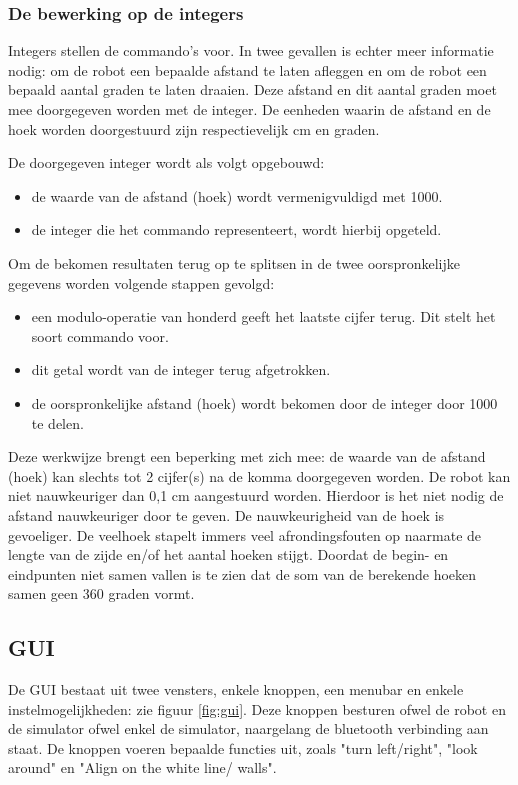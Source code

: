 \documentclass[tt3]{penoverslag}
\begin{document}
\subsubsection{De bewerking op de integers} %
\label{sssec:integer}
Integers stellen de commando's voor. In twee gevallen is echter meer informatie nodig: om de robot een bepaalde afstand te laten afleggen en om de robot een bepaald aantal graden te laten draaien. Deze afstand en dit aantal graden moet mee doorgegeven worden met de integer. De eenheden waarin de afstand en de hoek worden doorgestuurd zijn respectievelijk cm en graden.

De doorgegeven integer wordt als volgt opgebouwd:

\begin{itemize}
\item de waarde van de afstand (hoek) wordt vermenigvuldigd met 1000.
\item de integer die het commando representeert, wordt hierbij opgeteld.
\end{itemize}

Om de bekomen resultaten terug op te splitsen in de twee oorspronkelijke gegevens worden volgende stappen gevolgd:

\begin{itemize}
\item een modulo-operatie van honderd geeft het laatste cijfer terug. Dit stelt het soort commando voor.
\item dit getal wordt van de integer terug afgetrokken.
\item de oorspronkelijke afstand (hoek) wordt bekomen door de integer door 1000 te delen.
\end{itemize}

Deze werkwijze brengt een beperking met zich mee: de waarde van de afstand (hoek) kan slechts tot 2 cijfer(s) na de komma doorgegeven worden. De robot kan niet nauwkeuriger dan 0,1 cm aangestuurd worden. Hierdoor is het niet nodig de afstand nauwkeuriger door te geven. De nauwkeurigheid van de hoek is gevoeliger. De veelhoek stapelt immers veel afrondingsfouten op naarmate de lengte van de zijde en/of het aantal hoeken stijgt. Doordat de begin- en eindpunten niet samen vallen is te zien dat de som van de berekende hoeken samen geen 360 graden vormt. 

\subsection{GUI} %
\label{ssec:GUI}
De GUI bestaat uit twee vensters, enkele knoppen, een menubar en enkele instelmogelijkheden: zie figuur \ref{fig:gui}. Deze knoppen besturen ofwel de robot en de simulator ofwel enkel de simulator, naargelang de bluetooth verbinding aan staat. De knoppen voeren bepaalde functies uit, zoals "turn left/right", "look around" en "Align on the white line/ walls".\\
\end{document}
